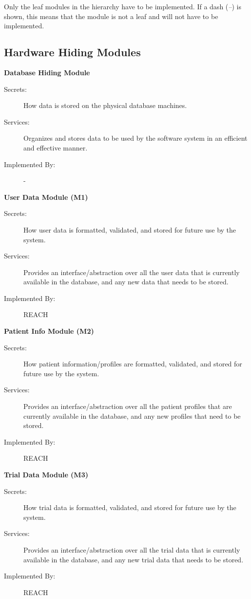 \documentclass[12pt, titlepage]{article}
\begin{document}
Only the leaf modules in the hierarchy have to be implemented. If a dash
(\emph{--}) is shown, this means that the module is not a leaf and will not have
to be implemented.

\subsection{Hardware Hiding Modules}

\textbf{Database Hiding Module}
\begin{description}
\item[Secrets:] How data is stored on the physical database machines.
\item[Services:] Organizes and stores data to be used by the software system in an efficient and effective manner.
\item[Implemented By:] -\\
\end{description}

\noindent \textbf{User Data Module (M1)}
\begin{description}
  \item[Secrets:] How user data is formatted, validated, and stored for future use by the system.
  \item[Services:] Provides an interface/abstraction over all the user data that is currently available in the database, and any new data that needs to be stored.
  \item[Implemented By:] REACH\\
\end{description}

\noindent \textbf{Patient Info Module (M2)}
\begin{description}
  \item[Secrets:] How patient information/profiles are formatted, validated, and stored for future use by the system.
  \item[Services:] Provides an interface/abstraction over all the patient profiles that are currently available in the database, and any new profiles that need to be stored.
  \item[Implemented By:] REACH\\
\end{description}

\noindent \textbf{Trial Data Module (M3)}
\begin{description}
  \item[Secrets:] How trial data is formatted, validated, and stored for future use by the system.
  \item[Services:] Provides an interface/abstraction over all the trial data that is currently available in the database, and any new trial data that needs to be stored.
  \item[Implemented By:] REACH\\
\end{description}
\end{document}
